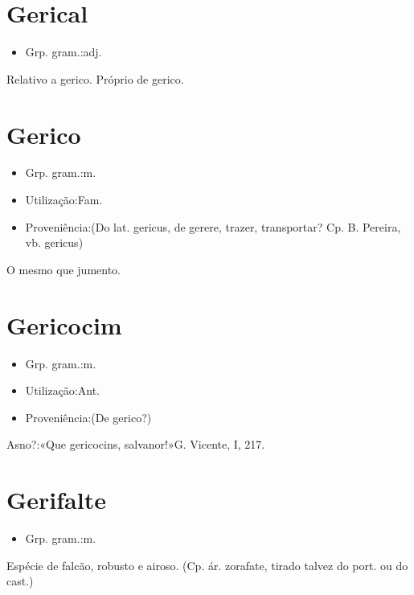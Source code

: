 \section{Gerical}
\begin{itemize}
\item {Grp. gram.:adj.}
\end{itemize}
Relativo a gerico.
Próprio de gerico.
\section{Gerico}
\begin{itemize}
\item {Grp. gram.:m.}
\end{itemize}
\begin{itemize}
\item {Utilização:Fam.}
\end{itemize}
\begin{itemize}
\item {Proveniência:(Do lat. \textunderscore gericus\textunderscore , de \textunderscore gerere\textunderscore , trazer, transportar? Cp. B. Pereira, vb. \textunderscore gericus\textunderscore )}
\end{itemize}
O mesmo que \textunderscore jumento\textunderscore .
\section{Gericocim}
\begin{itemize}
\item {Grp. gram.:m.}
\end{itemize}
\begin{itemize}
\item {Utilização:Ant.}
\end{itemize}
\begin{itemize}
\item {Proveniência:(De \textunderscore gerico\textunderscore ?)}
\end{itemize}
Asno?:«\textunderscore Que gericocins, salvanor!\textunderscore »G. Vicente, I, 217.
\section{Gerifalte}
\begin{itemize}
\item {Grp. gram.:m.}
\end{itemize}
Espécie de falcão, robusto e airoso.
(Cp. ár. \textunderscore zorafate\textunderscore , tirado talvez do port. ou do cast.)
